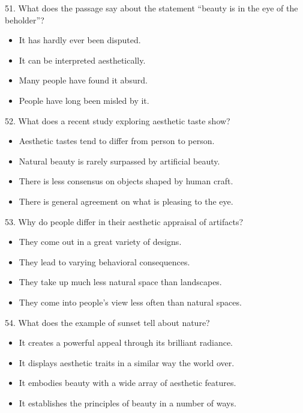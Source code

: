 \documentclass[UTF8,11pt]{ctexart}
\begin{document}
51. What does the passage say about the statement “beauty is in the eye of the beholder”?


\begin{itemize}[leftmargin=2em,itemsep=.2em,topsep=.4em]\item[A.] It has hardly ever been disputed.
\item[B.] It can be interpreted aesthetically.
\item[C.] Many people have found it absurd.
\item[D.] People have long been misled by it.
\end{itemize}

52. What does a recent study exploring aesthetic taste show?


\begin{itemize}[leftmargin=2em,itemsep=.2em,topsep=.4em]\item[A.] Aesthetic tastes tend to differ from person to person.
\item[B.] Natural beauty is rarely surpassed by artificial beauty.
\item[C.] There is less consensus on objects shaped by human craft.
\item[D.] There is general agreement on what is pleasing to the eye.
\end{itemize}

53. Why do people differ in their aesthetic appraisal of artifacts?


\begin{itemize}[leftmargin=2em,itemsep=.2em,topsep=.4em]\item[A.] They come out in a great variety of designs.
\item[B.] They lead to varying behavioral consequences.
\item[C.] They take up much less natural space than landscapes.
\item[D.] They come into people’s view less often than natural spaces.
\end{itemize}

54. What does the example of sunset tell about nature?


\begin{itemize}[leftmargin=2em,itemsep=.2em,topsep=.4em]\item[A.] It creates a powerful appeal through its brilliant radiance.
\item[B.] It displays aesthetic traits in a similar way the world over.
\item[C.] It embodies beauty with a wide array of aesthetic features.
\item[D.] It establishes the principles of beauty in a number of ways.
\end{itemize}
\end{document}
